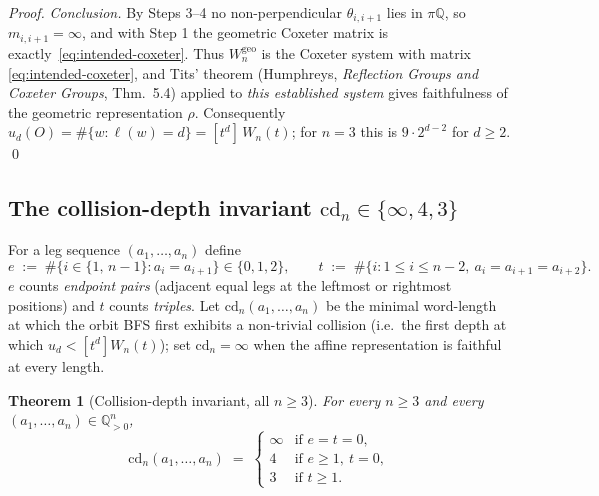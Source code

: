 \documentclass[11pt,a4paper]{article}
\newtheorem{theorem}{Theorem}
\theoremstyle{remark}
\theoremstyle{plain}
\begin{document}
\begin{proof}
\emph{Conclusion.}  By Steps 3--4 no non-perpendicular $\theta_{i,i+1}$
lies in $\pi\mathbb{Q}$, so $m_{i,i+1} = \infty$, and with Step 1 the
geometric Coxeter matrix is exactly~\eqref{eq:intended-coxeter}.  Thus
$W_n^{\mathrm{geo}}$ is the Coxeter system with matrix
\eqref{eq:intended-coxeter}, and Tits' theorem (Humphreys,
\emph{Reflection Groups and Coxeter Groups}, Thm.~5.4) applied to
\emph{this established system} gives faithfulness of the geometric
representation $\rho$.  Consequently
$u_d(O) = \#\{w : \ell(w) = d\} = [t^d]\, W_n(t)$; for $n = 3$ this is
$9 \cdot 2^{d-2}$ for $d \ge 2$.
\qed
\end{proof}

\subsection{The collision-depth invariant $\mathrm{cd}_n \in \{\infty, 4, 3\}$}

For a leg sequence $(a_1, \ldots, a_n)$ define
\[
e \;:=\; \#\bigl\{i \in \{1,\, n-1\} : a_i = a_{i+1}\bigr\} \in \{0, 1, 2\}, \qquad
t \;:=\; \#\bigl\{i : 1 \le i \le n-2,\ a_i = a_{i+1} = a_{i+2}\bigr\}.
\]
$e$ counts \emph{endpoint pairs} (adjacent equal legs at the leftmost
or rightmost positions) and $t$ counts \emph{triples}.  Let
$\mathrm{cd}_n(a_1, \ldots, a_n)$ be the minimal word-length at which
the orbit BFS first exhibits a non-trivial collision (i.e.\ the first
depth at which $u_d < [t^d] W_n(t)$); set $\mathrm{cd}_n = \infty$ when
the affine representation is faithful at every length.

\begin{theorem}[Collision-depth invariant, all $n \ge 3$]
\label{thm:cd-general}
For every $n \ge 3$ and every $(a_1, \ldots, a_n) \in \mathbb{Q}_{>0}^n$,
\[
\mathrm{cd}_n(a_1, \ldots, a_n) \;=\;
\begin{cases}
\infty & \text{if } e = t = 0, \\
4 & \text{if } e \ge 1,\ t = 0, \\
3 & \text{if } t \ge 1.
\end{cases}
\]
\end{theorem}
\end{document}
